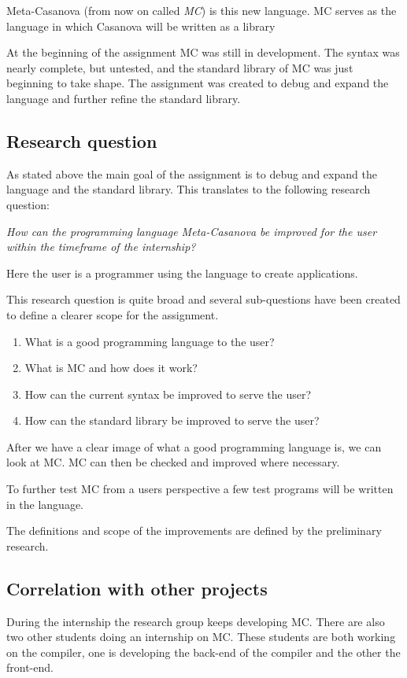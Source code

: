 Meta-Casanova (from now on called \emph{MC}) is this new language.
MC serves as the language in which Casanova will be written as a library

At the beginning of the assignment MC was still in development.
The syntax was nearly complete, but untested, and the standard library of MC was just beginning to take shape.
The assignment was created to debug and expand the language and further refine the standard library.


\subsection{Research question}
As stated above the main goal of the assignment is to debug and expand the language and the standard library.
This translates to the following research question:

\emph{How can the programming language Meta-Casanova be improved for the user within the timeframe of the internship?}

Here the user is a programmer using the language to create applications.

This research question is quite broad and several sub-questions have been created to define a clearer scope for the assignment.

\begin{enumerate}[noitemsep]
   \item What is a good programming language to the user?
   \item What is MC and how does it work?
   \item How can the current syntax be improved to serve the user?
   \item How can the standard library be improved to serve the user?
\end{enumerate}

After we have a clear image of what a good programming language is, we can look at MC.
MC can then be checked and improved where necessary.

To further test MC from a users perspective a few test programs will be written in the language.

The definitions and scope of the improvements are defined by the preliminary research.


\subsection{Correlation with other projects}
During the internship the research group keeps developing MC.
There are also two other students doing an internship on MC.
These students are both working on the compiler, one is developing the back-end of the compiler and the other the front-end.

